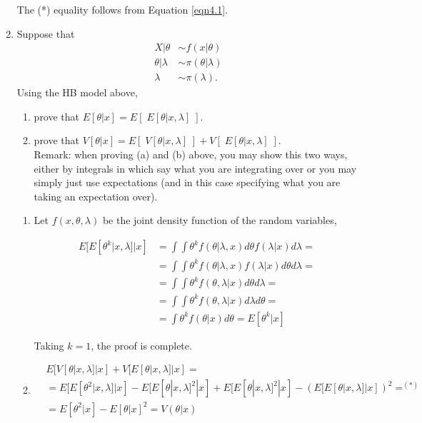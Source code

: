 \documentclass[11pt]{article}
\begin{document}
\begin{enumerate}
The (*) equality follows from Equation \ref{eqn4.1}.

\item Suppose that 
\begin{align*}
X|\theta &\sim f(x|\theta) \\
\theta|\lambda &\sim \pi(\theta|\lambda) \\
\lambda &\sim \pi(\lambda).
\end{align*}
Using the HB model above, 
\begin{enumerate}
\item prove that $E[\theta|x] = E[\;E[\theta|x,\lambda]\;] .$
\item prove that $V[\theta|x] = E[\;V[\theta|x,\lambda]\;]  + V[\;E[\theta|x,\lambda]\;] .$\\

Remark: when proving (a) and (b) above, you may show this two ways, either by integrals in which say what you are integrating over or you may simply just use expectations (and in this case specifying what you are taking an expectation over). 
\end{enumerate}



\begin{enumerate}
	\item Let $f(x,\theta,\lambda)$ be the joint density function of the random variables,

	\begin{align*}	
		E[E[\theta^{k}|x,\lambda]|x]	&= \int{\int{\theta^{k} f(\theta|\lambda,x) d\theta}f(\lambda|x)d\lambda} = \\
															&= \int{\int{\theta^{k} f(\theta|\lambda,x) f(\lambda|x) d\theta}d\lambda} = \\
															&= \int{\int{\theta^{k} f(\theta,\lambda|x) d\theta}d\lambda} = \\
															&= \int{\int{\theta^{k} f(\theta,\lambda|x) d\lambda}d\theta} = \\
															&= \int{\theta^{k} f(\theta|x) d\theta} = E[\theta^{k}|x]
	\end{align*}
	
	Taking $k=1$, the proof is complete.

	\item 
	
	\begin{align*}
		& E[V[\theta|x,\lambda]|x] + V[E[\theta|x,\lambda]|x] = \\
		& = E[E[\theta^{2}|x,\lambda]|x] - E[E[\theta|x,\lambda]^{2}|x] + E[E[\theta|x,\lambda]^{2}|x] - (E[E[\theta|x,\lambda]|x])^{2} =^{(*)} \\
		& = E[\theta^{2}|x] - E[\theta|x]^{2} = V(\theta|x)
	\end{align*}
	

\end{enumerate}
\end{enumerate}
\end{document}
